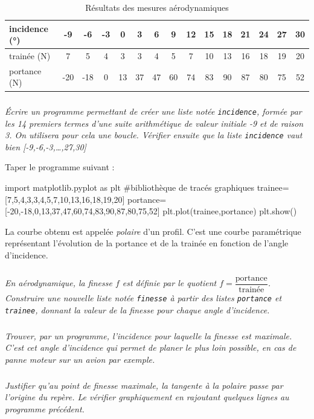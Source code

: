 \documentclass[10pt]{article}
\begin{document}
\begin{table}[h]
\centering
\begin{tabular}{|l|c|c|c|c|c|c|c|c|c|c|c|c|c|c|}
\hline
incidence (°) & -9 & -6 & -3 & 0 & 3 & 6 & 9 & 12 & 15 & 18 & 21 & 24 & 27 & 30 \\
\hline
trainée (N) & 7 &5&4&3&3&4&5&7&10&13&16&18&19&20 \\
\hline
portance (N) &-20&-18&0&13&37&47&60&74&83&90&87&80&75&52\\
\hline
\end{tabular}
\caption{Résultats des mesures aérodynamiques}\label{tab:mesures-aero}
\end{table}




\subparagraph{}
\textit{\'Ecrire un programme permettant de créer une liste notée \texttt{incidence}, formée par les 14 premiers termes d'une suite arithmétique de valeur initiale -9 et de raison 3. On utilisera pour cela une boucle. Vérifier ensuite que la liste \texttt{incidence} vaut bien [-9,-6,-3,\ldots{},27,30]}



Taper le programme suivant :
\begin{py}
\begin{python}
import matplotlib.pyplot as plt			#bibliothèque de tracés graphiques
trainee=[7,5,4,3,3,4,5,7,10,13,16,18,19,20]
portance=[-20,-18,0,13,37,47,60,74,83,90,87,80,75,52]
plt.plot(trainee,portance)
plt.show()
\end{python}
\end{py}

\begin{rem}
La courbe obtenu est appelée \emph{polaire} d'un profil. C'est une courbe paramétrique représentant l'évolution de la portance et de la trainée en fonction de l'angle d'incidence.
\end{rem}

\subparagraph{}
\textit{En aérodynamique, la finesse $f$ est définie par le quotient $f=\dfrac{\text{portance}}{\text{trainée}}$. Construire une nouvelle liste notée \texttt{finesse} à partir des listes \texttt{portance} et \texttt{trainee}, donnant la valeur de la finesse pour chaque angle d'incidence.}

\subparagraph{}
\textit{Trouver, par un programme, l'incidence pour laquelle la finesse est maximale. C'est cet angle d'incidence qui permet de planer le plus loin possible, en cas de panne moteur sur un avion par exemple.}

\subparagraph{}
\textit{Justifier qu'au point de finesse maximale, la tangente à la polaire passe par l'origine du repère. Le vérifier graphiquement en rajoutant quelques lignes au programme précédent.}
\end{document}
